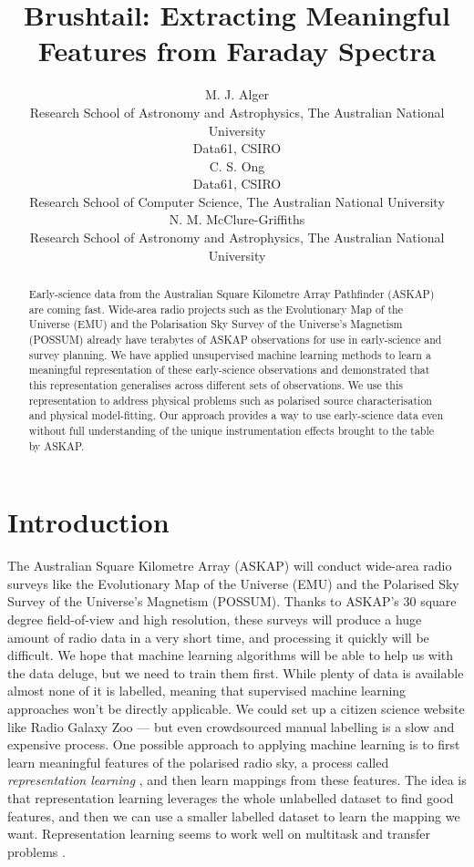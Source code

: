 \documentclass[a4paper]{article}
\title{Brushtail: Extracting Meaningful Features from Faraday Spectra}
\author{
    M. J. Alger\\{\small Research School of Astronomy and Astrophysics, The Australian National University}\\{\small Data61, CSIRO}\\
    C. S. Ong\\{\small Data61, CSIRO}\\{\small Research School of Computer Science, The Australian National University}\\
    N. M. McClure-Griffiths\\{\small Research School of Astronomy and Astrophysics, The Australian National University}\\}
\newcommand{\defn}[1]{\emph{#1}}
\begin{document}
    \maketitle

    \begin{abstract}
        Early-science data from the Australian Square Kilometre Array Pathfinder (ASKAP) are coming fast. Wide-area radio projects such as the Evolutionary Map of the Universe (EMU) and the Polarisation Sky Survey of the Universe’s Magnetism (POSSUM) already have terabytes of ASKAP observations for use in early-science and survey planning. We have applied unsupervised machine learning methods to learn a meaningful representation of these early-science observations and demonstrated that this representation generalises across different sets of observations. We use this representation to address physical problems such as polarised source characterisation and physical model-fitting. Our approach provides a way to use early-science data even without full understanding of the unique instrumentation effects brought to the table by ASKAP.
    \end{abstract}

    \section{Introduction}

        The Australian Square Kilometre Array (ASKAP) will conduct wide-area radio surveys like the Evolutionary Map of the Universe (EMU) and the Polarised Sky Survey of the Universe's Magnetism (POSSUM). Thanks to ASKAP's 30 square degree field-of-view and high resolution, these surveys will produce a huge amount of radio data in a very short time, and processing it quickly will be difficult. We hope that machine learning algorithms will be able to help us with the data deluge, but we need to train them first. While plenty of data is available almost none of it is labelled, meaning that supervised machine learning approaches won't be directly applicable. We could set up a citizen science website like Radio Galaxy Zoo --- but even crowdsourced manual labelling is a slow and expensive process. One possible approach to applying machine learning is to first learn meaningful features of the polarised radio sky, a process called \defn{representation learning} \citep{bengio12representation}, and then learn mappings from these features. The idea is that representation learning leverages the whole unlabelled dataset to find good features, and then we can use a smaller labelled dataset to learn the mapping we want. Representation learning seems to work well on multitask and transfer problems \citep{bengio12representation}.
\end{document}

